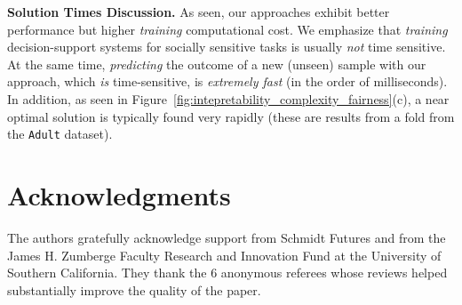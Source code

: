 \documentclass[letterpaper]{article} %
\theoremstyle{definition}
\newcommand{\1}{\ensuremath{{\rm e}}} %
\newcommand{\newsa}[1]{{\color{blue} #1}}
\begin{document}

\noindent\textbf{Solution Times Discussion.} As seen, our approaches exhibit better performance but higher \emph{training} computational cost. We emphasize that \emph{training} decision-support systems for socially sensitive tasks is usually \emph{not} time sensitive. At the same time, \emph{predicting} the outcome of a new (unseen) sample with our approach, which \emph{is} time-sensitive, is \emph{extremely fast} (in the order of milliseconds). In addition, as seen in Figure~\ref{fig:intepretability_complexity_fairness}(c), a near optimal solution is typically found very rapidly (these are results from a fold from the \texttt{Adult} dataset).

\section*{ Acknowledgments}
The authors gratefully acknowledge support from Schmidt Futures and from the James H. Zumberge Faculty Research and Innovation Fund at the University of Southern California. They thank the 6 anonymous referees whose reviews helped substantially improve the quality of the paper.

\fontsize{9.3pt}{10.3pt} \selectfont
\end{document}
